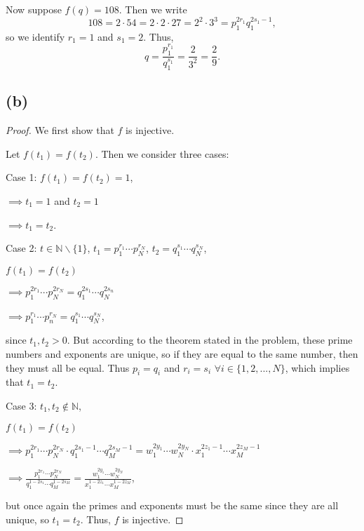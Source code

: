 \documentclass{article}
\begin{document}
Now suppose $f(q) = 108.$ Then we write
\begin{equation}
	108 = 2\cdot54 = 2\cdot2\cdot27 = 2^2 \cdot 3^3 = p_1^{2r_1}q_1^{2s_1 - 1},
\end{equation}
so we identify $r_1 = 1$ and $s_1=2$. Thus, 
\begin{equation}
	q = \frac{p_1^{r_1}}{q_1^{s_1}} = \frac{2}{3^2} = \frac{2}{9}.
\end{equation}

\subsection*{(b)}
\begin{proof}
	We first show that $f$ is injective.
	
	Let $f(t_1)=f(t_2)$. Then we consider three cases:
	
	Case 1: $f(t_1) = f(t_2) = 1$,
	
	$\implies t_1 = 1$ and $t_2 = 1$
	
	$\implies t_1 = t_2$.
	
	Case 2: $t\in \mathbb{N} \backslash \{1\} $, $t_1 = p_1^{r_1}\cdots p_N^{r_N}$, $t_2 = q_1^{s_1}\cdots q_N^{s_N}$,
	
	$f(t_1) = f(t_2)$
	
	$\implies p_1^{2r_1}\cdots p_N^{2r_N} = q_1^{2s_1} \cdots q_N^{2s_n}$
	
	$\implies p_1^{r_1} \cdots p_n^{r_N} = q_1^{s_1} \cdots q_N^{s_N}$,
	
	since $t_1, t_2 > 0$. But according to the theorem stated in the problem, these prime numbers and exponents are unique, so if they are equal to the same number, then they must all be equal. Thus $p_i = q_i$ and $r_i = s_i$ $\forall i\in\{1, 2, ..., N\}$, which implies that $t_1 = t_2$. 
	
	Case 3: $t_1, t_2 \notin \mathbb{N}$,
	
	$f(t_1) = f(t_2)$
	
	$\implies p_1^{2r_1} \cdots p_N^{2r_N} \cdot q_1^{2s_1 - 1} \cdots q_M^{2s_M - 1} = w_1^{2y_1} \cdots w_N^{2y_N} \cdot x_1^{2z_1 - 1} \cdots x_M^{2z_M - 1}$
	
	$\implies \frac{ p_1^{2r_1} \cdots p_N^{2r_N}}{q_1^{1 - 2s_1} \cdots q_M^{1 - 2s_M}} = \frac{w_1^{2y_1} \cdots w_N^{2y_N}}{x_1^{1 - 2z_1} \cdots x_M^{1 - 2z_M}}$,
	
	but once again the primes and exponents must be the same since they are all unique, so $t_1 = t_2$. 
	Thus, $f$ is injective. 
	

\end{proof}
\end{document}
